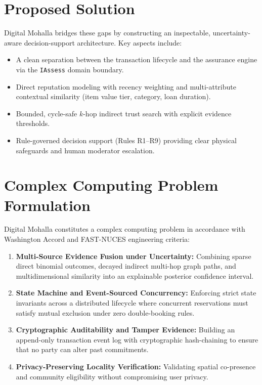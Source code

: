 \section{Proposed Solution}
Digital Mohalla bridges these gaps by constructing an inspectable, uncertainty-aware decision-support architecture. Key aspects include:
\begin{itemize}
    \item A clean separation between the transaction lifecycle and the assurance engine via the \texttt{IAssess} domain boundary.
    \item Direct reputation modeling with recency weighting and multi-attribute contextual similarity (item value tier, category, loan duration).
    \item Bounded, cycle-safe $k$-hop indirect trust search with explicit evidence thresholds.
    \item Rule-governed decision support (Rules R1--R9) providing clear physical safeguards and human moderator escalation.
\end{itemize}

\section{Complex Computing Problem Formulation}
Digital Mohalla constitutes a complex computing problem in accordance with Washington Accord and FAST-NUCES engineering criteria:
\begin{enumerate}
    \item \textbf{Multi-Source Evidence Fusion under Uncertainty:} Combining sparse direct binomial outcomes, decayed indirect multi-hop graph paths, and multidimensional similarity into an explainable posterior confidence interval.
    \item \textbf{State Machine and Event-Sourced Concurrency:} Enforcing strict state invariants across a distributed lifecycle where concurrent reservations must satisfy mutual exclusion under zero double-booking rules.
    \item \textbf{Cryptographic Auditability and Tamper Evidence:} Building an append-only transaction event log with cryptographic hash-chaining to ensure that no party can alter past commitments.
    \item \textbf{Privacy-Preserving Locality Verification:} Validating spatial co-presence and community eligibility without compromising user privacy.
\end{enumerate}

